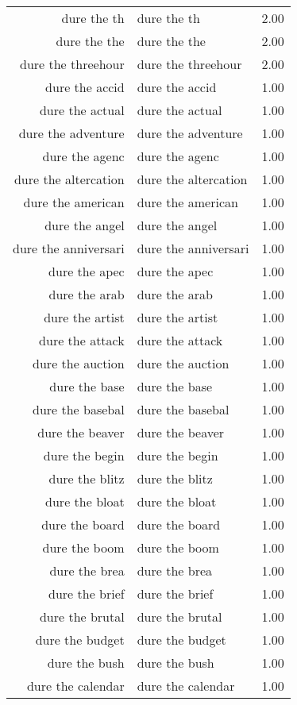 \begin{table}[ht]
\begin{tabular}{rlr}
  dure the th & dure the th & 2.00 \\ 
  dure the the & dure the the & 2.00 \\ 
  dure the threehour & dure the threehour & 2.00 \\ 
  dure the accid & dure the accid & 1.00 \\ 
  dure the actual & dure the actual & 1.00 \\ 
  dure the adventure & dure the adventure & 1.00 \\ 
  dure the agenc & dure the agenc & 1.00 \\ 
  dure the altercation & dure the altercation & 1.00 \\ 
  dure the american & dure the american & 1.00 \\ 
  dure the angel & dure the angel & 1.00 \\ 
  dure the anniversari & dure the anniversari & 1.00 \\ 
  dure the apec & dure the apec & 1.00 \\ 
  dure the arab & dure the arab & 1.00 \\ 
  dure the artist & dure the artist & 1.00 \\ 
  dure the attack & dure the attack & 1.00 \\ 
  dure the auction & dure the auction & 1.00 \\ 
  dure the base & dure the base & 1.00 \\ 
  dure the basebal & dure the basebal & 1.00 \\ 
  dure the beaver & dure the beaver & 1.00 \\ 
  dure the begin & dure the begin & 1.00 \\ 
  dure the blitz & dure the blitz & 1.00 \\ 
  dure the bloat & dure the bloat & 1.00 \\ 
  dure the board & dure the board & 1.00 \\ 
  dure the boom & dure the boom & 1.00 \\ 
  dure the brea & dure the brea & 1.00 \\ 
  dure the brief & dure the brief & 1.00 \\ 
  dure the brutal & dure the brutal & 1.00 \\ 
  dure the budget & dure the budget & 1.00 \\ 
  dure the bush & dure the bush & 1.00 \\ 
  dure the calendar & dure the calendar & 1.00 \\ 

\end{tabular}
\end{table}
